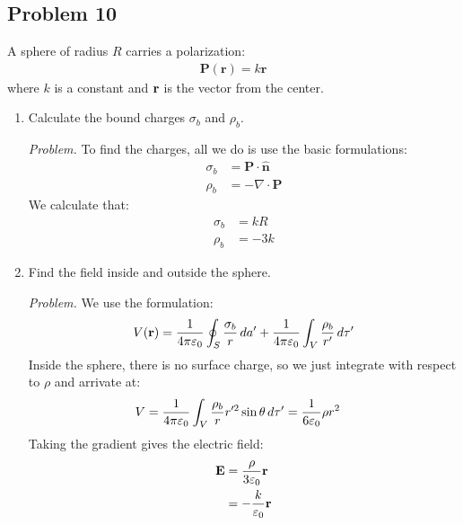 \documentclass[10pt,oneside]{book}
\newcommand{\gspc}{\vspace{0.13cm}} %
\newenvironment{problem}[1]
  {\vspace{-0.1cm}\begin{tcolorbox}[problembox]
   \textit{Problem. }#1}
  {\end{tcolorbox}\gspc}
\newcommand{\unit}[1]{\mathbf{\hat{#1}}}
\begin{document}
\subsection*{Problem 10}
A sphere of radius $R$ carries a polarization:
\begin{align*}
  \mathbf{P}(\mathbf r) = k\mathbf{r}
\end{align*}
where $k$ is a constant and ${\mathbf{r}}$ is the vector from the center.
\begin{enumerate}[itemsep=0pt, parsep=0pt]
  \item Calculate the bound charges $\sigma_b$ and $\rho_b$.
  \begin{problem}
    To find the charges, all we do is use the basic formulations:
    \begin{align*}
      \sigma_b &= \mathbf{P}\cdot \unit{n}\\
      \rho_b &= -\nabla \cdot \mathbf P
    \end{align*}
    We calculate that:
    \begin{align*}
      \sigma_b &= kR\\
      \rho_b &= -3k
    \end{align*}
  \end{problem}
  \item Find the field inside and outside the sphere. 
  \begin{problem}
    We use the formulation:
    \begin{align*}
      V({\mathbf{r}}) = \frac{1}{4\pi\varepsilon_0}\oint_S\frac{\sigma_b}{r}\,da' + \frac{1}{4\pi\varepsilon_0}\int_V\frac{\rho_b}{r'}\,d\tau'
    \end{align*}
    Inside the sphere, there is no surface charge, so we just integrate with respect to $\rho$ and arrivate at:
    \begin{align*}
      V = \frac{1}{4\pi\varepsilon_0}\int_V\frac{\rho_b}rr'^2\sin\theta\,d\tau' &= \frac{1}{6\varepsilon_0}\rho r^2
    \end{align*}
    Taking the gradient gives the electric field:
    \begin{align*}
      {\mathbf{E}}&=\frac{\rho}{3\varepsilon_0}{\mathbf{r}}\\
      &=-\frac{k}{\varepsilon_0}{\mathbf{r}}
    \end{align*}
  \end{problem}
\end{enumerate}
\end{document}
